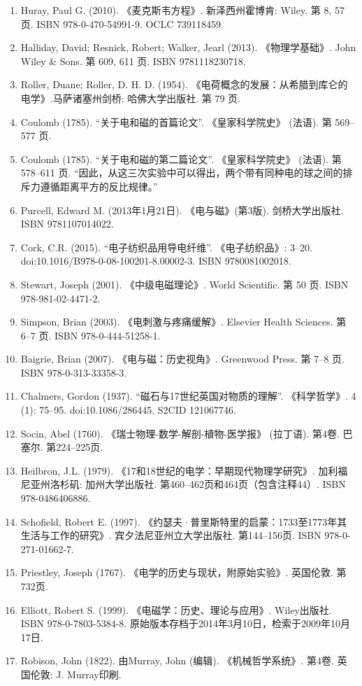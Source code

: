\begin{enumerate}
\item Huray, Paul G. (2010). 《麦克斯韦方程》. 新泽西州霍博肯: Wiley. 第 8, 57 页. ISBN 978-0-470-54991-9. OCLC 739118459.
\item Halliday, David; Resnick, Robert; Walker, Jearl (2013). 《物理学基础》. John Wiley & Sons. 第 609, 611 页. ISBN 9781118230718.
\item Roller, Duane; Roller, D. H. D. (1954). 《电荷概念的发展：从希腊到库仑的电学》.马萨诸塞州剑桥: 哈佛大学出版社. 第 79 页.
\item Coulomb (1785). “关于电和磁的首篇论文”. 《皇家科学院史》 (法语). 第 569–577 页.
\item Coulomb (1785). “关于电和磁的第二篇论文”. 《皇家科学院史》 (法语). 第 578–611 页. “因此，从这三次实验中可以得出，两个带有同种电的球之间的排斥力遵循距离平方的反比规律。”
\item Purcell, Edward M. (2013年1月21日). 《电与磁》(第3版). 剑桥大学出版社. ISBN 9781107014022.
\item Cork, C.R. (2015). “电子纺织品用导电纤维”. 《电子纺织品》: 3–20. doi:10.1016/B978-0-08-100201-8.00002-3. ISBN 9780081002018.
\item Stewart, Joseph (2001). 《中级电磁理论》. World Scientific. 第 50 页. ISBN 978-981-02-4471-2.
\item Simpson, Brian (2003). 《电刺激与疼痛缓解》. Elsevier Health Sciences. 第 6–7 页. ISBN 978-0-444-51258-1.
\item Baigrie, Brian (2007). 《电与磁：历史视角》. Greenwood Press. 第 7–8 页. ISBN 978-0-313-33358-3.
\item Chalmers, Gordon (1937). “磁石与17世纪英国对物质的理解”. 《科学哲学》. 4 (1): 75–95. doi:10.1086/286445. S2CID 121067746.
\item Socin, Abel (1760). 《瑞士物理-数学-解剖-植物-医学报》 (拉丁语). 第4卷. 巴塞尔. 第224–225页.
\item Heilbron, J.L. (1979). 《17和18世纪的电学：早期现代物理学研究》. 加利福尼亚州洛杉矶: 加州大学出版社. 第460–462页和464页（包含注释44）. ISBN 978-0486406886.
\item Schofield, Robert E. (1997). 《约瑟夫·普里斯特里的启蒙：1733至1773年其生活与工作的研究》. 宾夕法尼亚州立大学出版社. 第144–156页. ISBN 978-0-271-01662-7.
\item Priestley, Joseph (1767). 《电学的历史与现状，附原始实验》. 英国伦敦. 第732页.
\item Elliott, Robert S. (1999). 《电磁学：历史、理论与应用》. Wiley出版社. ISBN 978-0-7803-5384-8. 原始版本存档于2014年3月10日，检索于2009年10月17日.
\item Robison, John (1822). 由Murray, John (编辑). 《机械哲学系统》. 第4卷. 英国伦敦: J. Murray印刷.
\end{enumerate}

